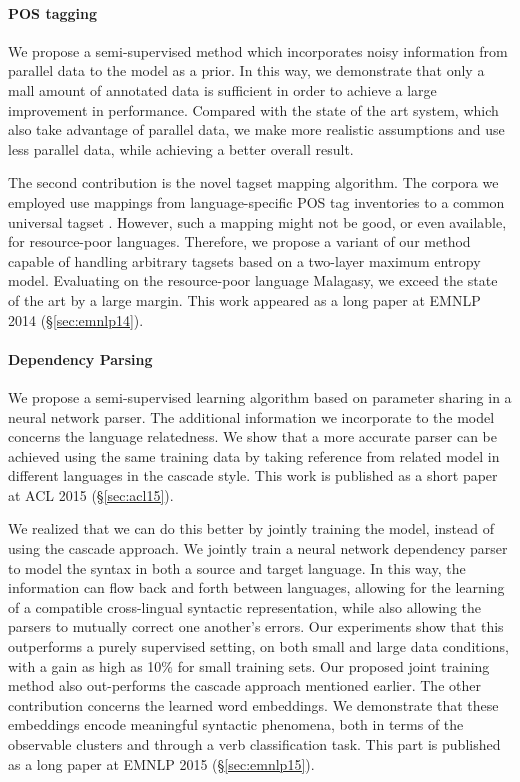 \documentclass[12pt,twoside,final,hidelinks]{ltthesis}
\theoremstyle{definition}
\newcommand\emnlpiv{EMNLP 2014 (\S\ref{sec:emnlp14})}
\newcommand\aclv{ACL 2015 (\S\ref{sec:acl15})}
\newcommand\emnlpv{EMNLP 2015 (\S\ref{sec:emnlp15})}
\begin{document}
\paragraph{POS tagging} We propose a semi-supervised method which incorporates noisy information from parallel data to the model as a prior. In this way, we 
demonstrate that only a mall amount of annotated data is sufficient in order to achieve a large improvement in performance. Compared with the state of the art system, 
which also take advantage of parallel data, we make more realistic assumptions and use less parallel data, while achieving a better overall result. 

The second contribution is the novel tagset mapping algorithm. The corpora we employed use mappings from language-specific POS tag inventories to a common universal tagset \cite{UniversalTagSet}. However, such a mapping might not be good, or even available, for resource-poor languages. Therefore, we propose a variant of our method capable of handling arbitrary tagsets based on a two-layer maximum entropy model. Evaluating on the resource-poor language Malagasy, we exceed the state of the art by a large margin. This work appeared as a long paper at \emnlpiv. 

\paragraph{Dependency Parsing} We propose a semi-supervised learning algorithm based on parameter sharing in a neural network parser. The additional information we incorporate to the model concerns the language relatedness. We show that a more accurate parser can be achieved using the same training data by taking reference from related model in different languages in the cascade style. This work is published as a short paper at \aclv. 

We realized that we can do this better by jointly training the model, instead of using the cascade approach. We jointly train a neural network dependency parser to model the syntax in both a source and target language. In this way, the information can flow back and forth between languages, allowing for the learning of a compatible cross-lingual syntactic representation, while also allowing the parsers to mutually correct one another's errors. 
Our experiments show that this outperforms a purely supervised setting, on both small and large data conditions, with a gain as high as 10\% for small training sets. 
Our proposed joint training method also out-performs the cascade approach mentioned earlier. The other contribution concerns the learned word embeddings.
We demonstrate that these embeddings encode meaningful syntactic phenomena, both in terms of the observable clusters and through a verb classification task. This part is published as a long paper at \emnlpv. 
\end{document}
